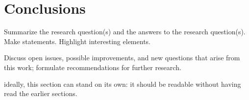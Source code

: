 \section{Conclusions}\label{conclusion}
Summarize the research question(s) and the answers to the research question(s).
Make statements.
Highlight interesting elements.

Discuss open issues, possible improvements, and new questions that arise from this work; formulate recommendations for further research.

ideally, this section can stand on its own: it should be readable without having read the earlier sections.